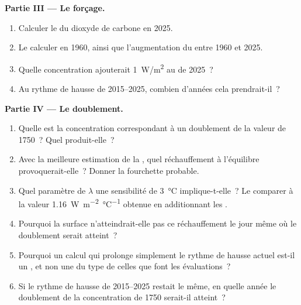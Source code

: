 \begin{problem}
\medskip
\noindent\textbf{Partie III --- Le forçage.}
\begin{enumerate}[resume]
  \item Calculer le  du dioxyde de carbone en 2025.
  \item Le calculer en 1960, ainsi que l'augmentation du  entre 1960
        et 2025.
  \item Quelle concentration ajouterait \qty{1}{W/m^2} au  de
        2025~?
  \item Au rythme de hausse de 2015--2025, combien d'années cela
        prendrait-il~?
\end{enumerate}

\medskip
\noindent\textbf{Partie IV --- Le doublement.}
\begin{enumerate}[resume]
  \item Quelle est la concentration correspondant à un doublement de la
        valeur de 1750~? Quel  produit-elle~?
  \item Avec la meilleure estimation de la , quel réchauffement à l'équilibre provoquerait-elle~?
        Donner la fourchette probable.
  \item Quel paramètre de  $\lambda$ une sensibilité de
        \qty{3}{\degreeCelsius} implique-t-elle~? Le comparer à la valeur
        \qty{1.16}{W.m^{-2}.\degreeCelsius^{-1}} obtenue en additionnant
        les .
  \item Pourquoi la surface n'atteindrait-elle pas ce réchauffement le jour
        même où le doublement serait atteint~?
  \item Pourquoi un calcul qui prolonge simplement le rythme de hausse
        actuel est-il un , et non une  du type de celles
        que font les évaluations~?
  \item Si le rythme de hausse de 2015--2025 restait le même, en quelle
        année le doublement de la concentration de 1750 serait-il atteint~?
\end{enumerate}
\end{problem}
